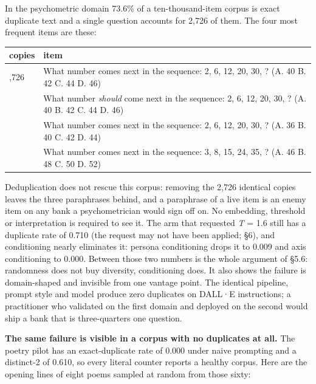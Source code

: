 \documentclass[
  10pt,
]{article}
\theoremstyle{plain}
\theoremstyle{definition}
\begin{document}
In the psychometric domain 73.6\% of a ten-thousand-item corpus is exact
duplicate text and a single question accounts for 2,726 of them. The
four most frequent items are these:

{\footnotesize
\begin{longtable}[]{@{}>{\raggedright\arraybackslash}p{}>{\raggedright\arraybackslash}p{}@{}}
\toprule\noalign{}
copies & item \\
\midrule\noalign{}
\endhead
\bottomrule\noalign{}
\endlastfoot
2,726 & What number comes next in the sequence: 2, 6, 12, 20, 30, ? (A.
40 B. 42 C. 44 D. 46) \\
655 & What number \emph{should} come next in the sequence: 2, 6, 12, 20,
30, ? (A. 40 B. 42 C. 44 D. 46) \\
467 & What number comes next in the sequence: 2, 6, 12, 20, 30, ? (A. 36
B. 40 C. 42 D. 44) \\
434 & What number comes next in the sequence: 3, 8, 15, 24, 35, ? (A. 46
B. 48 C. 50 D. 52) \\
\end{longtable}}

Deduplication does not rescue this corpus: removing the 2,726 identical
copies leaves the three paraphrases behind, and a paraphrase of a live
item is an enemy item on any bank a psychometrician would sign off on.
No embedding, threshold or interpretation is required to see it. The arm
that requested \emph{T} = 1.6 still has a duplicate rate of 0.710 (the
request may not have been applied; §6), and conditioning nearly
eliminates it: persona conditioning drops it to 0.009 and axis
conditioning to 0.000. Between those two numbers is the whole argument
of §5.6: randomness does not buy diversity, conditioning does. It also
shows the failure is domain-shaped and invisible from one vantage point.
The identical pipeline, prompt style and model produce zero duplicates
on DALL·E instructions; a practitioner who validated on the first domain
and deployed on the second would ship a bank that is three-quarters one
question.

\textbf{The same failure is visible in a corpus with no duplicates at
all.} The poetry pilot has an exact-duplicate rate of 0.000 under naive
prompting and a distinct-2 of 0.610, so every literal counter reports a
healthy corpus. Here are the opening lines of eight poems sampled at
random from those sixty:
\end{document}
